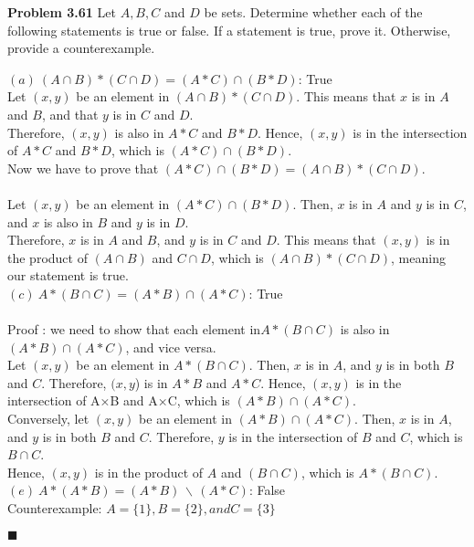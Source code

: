\documentclass[12pt]{article}
\renewcommand{\qed}{\hfill$\blacksquare$}
\begin{document}
\noindent\textbf{Problem 3.61} Let $A, B, C$ and $D$ be sets. Determine whether each of the following statements is true or false. If a statement is true, prove it. Otherwise, provide a counterexample.\\
\begin{addmargin}[1em]{1em}
    $(a) \ (A \cap B) * (C \cap D) = (A * C) \cap (B * D)$: True\\
    Let $(x, y)$ be an element in $(A \cap B) * (C \cap D)$. This means that $x$ is in $A$ and $B$, and that $y$ is in $C$ and $D$.\\
    Therefore, $(x, y)$ is also in $A*C$ and $B*D$. Hence, $(x, y)$ is in the intersection of $A*C$ and $B*D$, which is $(A*C)\cap (B*D)$.\\
    Now we have to prove that $ (A * C) \cap (B * D) = (A \cap B) * (C \cap D)$.\\\\
    Let $(x, y)$ be an element in $(A*C) \cap (B*D)$. Then, $x$ is in $A$ and $y$ is in $C$, and $x$ is also in $B$ and $y$ is in $D$.\\
    Therefore, $x$ is in $A$ and $B$, and $y$ is in $C$ and $D$. This means that $(x, y)$ is in the product of $(A\cap B)$ and $C\cap D$, which is $(A\cap B)*(C \cap D)$, meaning our statement is true. \\

    \noindent$(c) \ A * (B \cap C) = (A * B) \cap (A * C)$: True\\\\
    Proof : we need to show that each element in$ A*(B\cap C)$ is also in $(A*B)\cap(A*C)$, and vice versa.\\
    
    \noindent Let $(x, y)$ be an element in $A*(B\cap C)$. Then, $x$ is in $A$, and $y$ is in both $B$ and $C$. Therefore, $(x, y$) is in $A*B$ and $A*C$. Hence, $(x, y)$ is in the intersection of A×B and A×C, which is $(A*B)\cap(A*C)$.\\
    
    \noindent Conversely, let $(x, y)$ be an element in $(A*B)\cap(A*C)$. Then, $x$ is in $A$, and $y$ is in both $B$ and $C$. Therefore, $y$ is in the intersection of $B$ and $C$, which is $B\cap C$.\\
    
    \noindent Hence, $(x, y)$ is in the product of $A$ and $(B\cap C)$, which is $A*(B\cap C)$.\\
    

    \noindent$(e) \ A * (A * B) = (A*B)\,\backslash\,(A*C)$: False\\
    Counterexample: $A=\{1\}, B=\{2\}, and C=\{3\}$\\
    \begin{flushright}
    \qed
    \end{flushright}
    
\end{addmargin}
\end{document}
